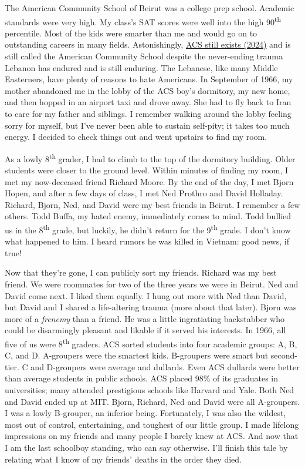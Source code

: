 The American Community School of Beirut was a college prep school.
Academic standards were very high. My class's SAT scores were well into
the high 90\textsuperscript{th} percentile. Most of the kids were
smarter than me and would go on to outstanding careers in many fields.
Astonishingly, \href{https://www.acs.edu.lb/}{ACS still exists (2024)}
and is still called the American Community School despite the
never-ending trauma Lebanon has endured and is still enduring. The
Lebanese, like many Middle Easterners, have plenty of reasons to hate
Americans. In September of 1966, my mother abandoned me in the lobby of
the ACS boy's dormitory, my new home, and then hopped in an airport taxi
and drove away. She had to fly back to Iran to care for my father and
siblings. I remember walking around the lobby feeling sorry for myself,
but I've never been able to sustain self-pity; it takes too much energy.
I decided to check things out and went upstairs to find my room.

As a lowly 8\textsuperscript{th} grader, I had to climb to the top of
the dormitory building. Older students were closer to the ground level.
Within minutes of finding my room, I met my now-deceased friend Richard
Moore. By the end of the day, I met Bjorn Hopen, and after a few days of
class, I met Ned Prothro and David Holladay. Richard, Bjorn, Ned, and
David were my best friends in Beirut. I remember a few others. Todd
Buffa, my hated enemy, immediately comes to mind. Todd bullied us in the
8\textsuperscript{th} grade, but luckily, he didn't return for the
9\textsuperscript{th} grade. I don't know what happened to him. I heard
rumors he was killed in Vietnam: good news, if true!~

Now that they're gone, I can publicly sort my friends. Richard was my
best friend. We were roommates for two of the three years we were in
Beirut. Ned and David come next. I liked them equally. I hung out more
with Ned than David, but David and I shared a life-altering trauma (more
about that later). Bjorn was more of a \emph{frenemy} than a friend. He
was a little ingratiating backstabber who could be disarmingly pleasant
and likable if it served his interests. In 1966, all five of us were
8\textsuperscript{th} graders. ACS sorted students into four academic
groups: A, B, C, and D. A-groupers were the smartest kids. B-groupers
were smart but second-tier. C and D-groupers were average and dullards.
Even ACS dullards were better than average students in public schools.
ACS placed 98\% of its graduates in universities; many attended
prestigious schools like Harvard and Yale. Both Ned and David ended up
at MIT. Bjorn, Richard, Ned and David were all A-groupers. I was a lowly
B-grouper, an inferior being. Fortunately, I was also the wildest, most
out of control, entertaining, and toughest of our little group. I made
lifelong impressions on my friends and many people I barely knew at ACS.
And now that I am the last schoolboy standing, who can say otherwise.
I'll finish this tale by relating what I know of my friends' deaths in
the order they died.

